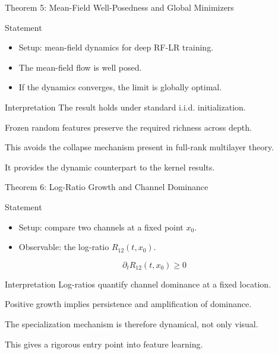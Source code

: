 \documentclass[aspectratio=169]{beamer}
\begin{document}
\begin{frame}{Theorem 5: Mean-Field Well-Posedness and Global Minimizers}
  \small
  \begin{block}{Statement}
    \begin{itemize}
      \item Setup: mean-field dynamics for deep RF-LR training.
      \item The mean-field flow is well posed.
      \item If the dynamics converges, the limit is globally optimal.
    \end{itemize}
  \end{block}
  \begin{alertblock}{Interpretation}
    The result holds under standard i.i.d. initialization.

    Frozen random features preserve the required richness across depth.

    This avoids the collapse mechanism present in full-rank multilayer theory.

    It provides the dynamic counterpart to the kernel results.
  \end{alertblock}
\end{frame}

\begin{frame}{Theorem 6: Log-Ratio Growth and Channel Dominance}
  \small
  \begin{block}{Statement}
    \begin{itemize}
      \item Setup: compare two channels at a fixed point $x_0$.
      \item Observable: the log-ratio $R_{12}(t,x_0)$.
    \end{itemize}
    \[
    \partial_t R_{12}(t,x_0)\ge 0
    \]
  \end{block}
  \begin{alertblock}{Interpretation}
    Log-ratios quantify channel dominance at a fixed location.

    Positive growth implies persistence and amplification of dominance.

    The specialization mechanism is therefore dynamical, not only visual.

    This gives a rigorous entry point into feature learning.
  \end{alertblock}
\end{frame}
\end{document}
